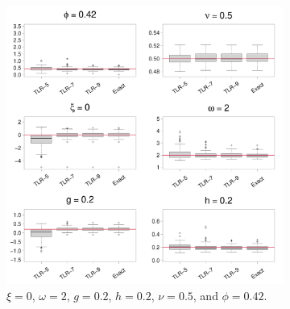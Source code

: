 \documentclass[conference]{IEEEtran}
\begin{document}
\begin{figure}[htp!]
\centering
\begin{subfigure}{0.45\textwidth}%
  \centering
  \includegraphics[width=\linewidth]{./figures/boxplot_0.420000_0.200000_0.200000.pdf}
  \caption{ $\xi = 0$, $\omega = 2$, $g = 0.2$, $h = 0.2$, $\nu = 0.5$, and $\phi = 0.42$.}
\end{subfigure}%
\hspace{4mm}
\begin{subfigure}{0.45\textwidth}%
  \centering

\end{subfigure}
\end{figure}
\end{document}
